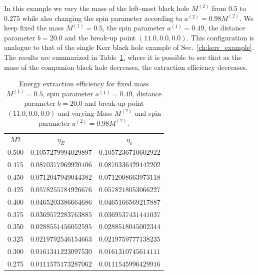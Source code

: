In this example we vary the mass of the left-most black hole $M^{(2)}$ from $0.5$ to $0.275$ while also changing the spin parameter according to $a^{(2)} = 0.98 M^{(2)}$. We keep fixed the mass $M^{(1)} = 0.5$, the spin parameter $a^{(1)} = 0.49$, the distance parameter $b=20.0$ and the break-up point $(11.0, 0.0, 0.0)$. This configuration is analogue to that of the single Kerr black hole example of Sec.~\ref{ch:kerr_example}. The results are summarized in Table~\ref{tab:arbitrary_penrose_sks_example_results_M2_variation}, where it is possible to see that as the mass of the companion black hole decreases, the extraction efficiency decreases.

\begin{table}[]
  \centering
  \begin{tabular}{ccc}
    \hline\hline
    $M2$  & $\eta_E$             & $\eta_\varepsilon$   \\
    0.500 & $0.1057279994029897$ & $0.1057236710602922$ \\
    0.475 & $0.0870377969920106$ & $0.0870336429442202$ \\
    0.450 & $0.0712047949044382$ & $0.0712008663973118$ \\
    0.425 & $0.0578255784926676$ & $0.0578218053066227$ \\
    0.400 & $0.0465203386664686$ & $0.0465166569217887$ \\
    0.375 & $0.0369572283763885$ & $0.0369537431441037$ \\
    0.350 & $0.0288551456052595$ & $0.0288518045002344$ \\
    0.325 & $0.0219792546154663$ & $0.0219759777138235$ \\
    0.300 & $0.0161341223097530$ & $0.0161310745614111$ \\
    0.275 & $0.0111575173287062$ & $0.0111545996429916$ \\ \hline\hline
  \end{tabular}
  \caption{Energy extraction efficiency for fixed mass $M^{(1)} = 0.5$, spin parameter $a^{(1)} = 0.49$, distance parameter $b=20.0$ and break-up point $(11.0, 0.0, 0.0)$ and varying Mass $M^{(2)}$ and spin parameter $a^{(2)} = 0.98 M^{(2)}$.}
  \label{tab:arbitrary_penrose_sks_example_results_M2_variation}
\end{table}